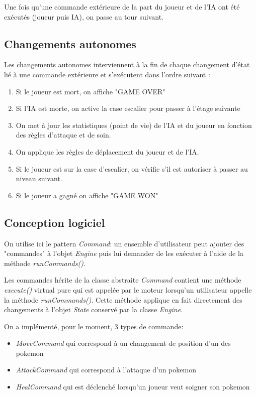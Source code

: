 \documentclass[a4paper,12pt]{article}
\begin{document}
    Une fois qu'une commande extérieure de la part du joueur et de l'IA ont été exécutés (joueur puis IA), on passe au tour suivant.
    
    \subsection{Changements autonomes}
    
    Les changements autonomes interviennent à la fin de chaque changement d'état lié à une commande extérieure et s'exécutent dans l'ordre suivant : 
    \begin{enumerate}
        \item Si le joueur est mort, on affiche "GAME OVER"
        \item Si l'IA est morte, on active la case escalier pour passer à l'étage suivante
        \item On met à jour les statistiques (point de vie) de l'IA et du joueur en fonction des règles d'attaque et de soin.
        \item On applique les règles de déplacement du joueur et de l'IA. 
        \item Si le joueur est sur la case d'escalier, on vérifie s'il est autoriser à passer au niveau suivant.
\item Si le joueur a gagné on affiche "GAME WON"
    \end{enumerate}
    
    
    
    
    


    \clearpage
    \subsection{Conception logiciel}
On utilise ici le pattern \emph{Command}: un ensemble d'utilisateur peut ajouter des "commandes" à l'objet \emph{Engine} puis lui demander de les exécuter à l'aide de la méthode \emph{runCommands()}.

Les commandes hérite de la classe abstraite \emph{Command} contient une méthode \emph{execute()} virtual pure qui est appelée par le moteur lorsqu'un utilisateur appelle la méthode \emph{runCommands()}. Cette méthode applique en fait directement des changements à l'objet \emph{State} conservé par la classe \emph{Engine}.

On a  implémenté, pour le moment, 3 types de commande:
\begin{itemize}
\item \emph{MoveCommand} qui correspond à un changement de position d'un des pokemon
\item \emph{AttackCommand} qui correspond à l'attaque d'un pokemon
\item \emph{HealCommand} qui est déclenché lorsqu'un joueur veut soigner son pokemon 
\end{itemize}
\end{document}
